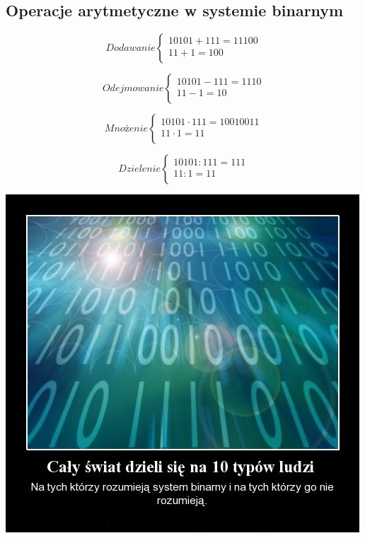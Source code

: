 \documentclass[12pt]{article}
\begin{document}
\newpage

\subsection{Operacje arytmetyczne w systemie binarnym }
\begin{center}
$$Dodawanie\left\{
\begin{array}{ccc}
10101+111=11100\\
11+1=100\\


\end{array}
\right.$$

 

$$Odejmowanie\left\{
\begin{array}{ccc}
10101-111=1110\\
11-1=10\\


\end{array}
\right.$$


$$Mnożenie\left\{
\begin{array}{ccc}
10101\cdot111=10010011\\
11\cdot1=11\\


\end{array}
\right.$$

$$Dzielenie\left\{
\begin{array}{ccc}
10101:111=111\\
11:1=11\\


\end{array}
\right.$$

\end{center}

\begin{center}
\includegraphics[scale=0.8]{jpg1.jpg}
\end{center}
\end{document}
